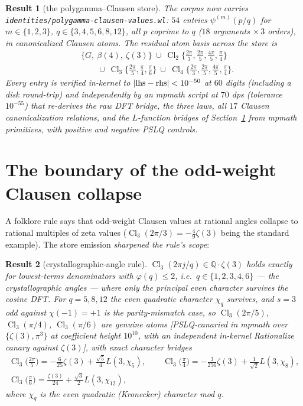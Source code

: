 \documentclass[11pt]{article}
\newtheorem{result}{Result}[section]
\theoremstyle{remark}
\newcommand{\Cl}{\operatorname{Cl}}
\newcommand{\Catalan}{G}
\newcommand{\dps}[1]{\textsf{\footnotesize[#1]}}
\begin{document}
\begin{result}[the polygamma--Clausen store]\label{res:store}
The corpus now carries \texttt{identities/polygamma-clausen-values.wl}: $54$ entries
$\psi^{(m)}(p/q)$ for $m\in\{1,2,3\}$, $q\in\{3,4,5,6,8,12\}$, all $p$ coprime to $q$
($18$ arguments $\times\,3$ orders), in canonicalized Clausen atoms. The residual atom
basis across the store is
\begin{align*}
&\{\Catalan,\ \beta(4),\ \zeta(3)\}\ \cup\
\Cl_2\bigl\{\tfrac{2\pi}{3},\tfrac{2\pi}{5},\tfrac{4\pi}{5},\tfrac{\pi}{4}\bigr\}\\
&\qquad\cup\
\Cl_3\bigl\{\tfrac{2\pi}{5},\tfrac{\pi}{4},\tfrac{\pi}{6}\bigr\}\ \cup\
\Cl_4\bigl\{\tfrac{2\pi}{3},\tfrac{2\pi}{5},\tfrac{4\pi}{5},\tfrac{\pi}{4}\bigr\}.
\end{align*}
Every entry is verified in-kernel to $|{\rm lhs}-{\rm rhs}|<10^{-50}$ at $60$ digits
(including a disk round-trip) and independently by an mpmath script at $70$ dps
(tolerance $10^{-55}$) that re-derives the raw DFT bridge, the three laws, all $17$
Clausen canonicalization relations, and the $L$-function bridges of
Section~\ref{sec:collapse} from mpmath primitives, with positive and negative PSLQ
controls.
\end{result}

\section{The boundary of the odd-weight Clausen collapse}\label{sec:collapse}

A folklore rule says that odd-weight Clausen values at rational angles collapse to
rational multiples of zeta values ($\Cl_3(2\pi/3)=-\tfrac49\zeta(3)$ being the standard
example). The store emission \emph{sharpened the rule's scope}:

\begin{result}[crystallographic-angle rule]\label{res:crystal}
$\Cl_3(2\pi j/q)\in\mathbb{Q}\cdot\zeta(3)$ holds exactly for lowest-terms denominators
with $\varphi(q)\le2$, i.e.\ $q\in\{1,2,3,4,6\}$ --- the crystallographic angles --- where
only the principal even character survives the cosine DFT. For $q=5,8,12$ the even
quadratic character $\chi_q$ survives, and $s=3$ odd against $\chi(-1)=+1$ is the
parity-\emph{mismatch} case, so $\Cl_3(2\pi/5)$, $\Cl_3(\pi/4)$, $\Cl_3(\pi/6)$ are genuine
atoms \dps{PSLQ-canaried in mpmath over $\{\zeta(3),\pi^3\}$ at coefficient height
$10^{10}$, with an independent in-kernel Rationalize canary against $\zeta(3)$}, with
exact character bridges
\begin{gather*}
\Cl_3\!\bigl(\tfrac{2\pi}{5}\bigr)=-\tfrac{6}{25}\zeta(3)+\tfrac{\sqrt5}{4}L(3,\chi_5),
\qquad
\Cl_3\!\bigl(\tfrac{\pi}{4}\bigr)=-\tfrac{3}{256}\zeta(3)+\tfrac{1}{\sqrt2}L(3,\chi_8),\\
\Cl_3\!\bigl(\tfrac{\pi}{6}\bigr)=\tfrac{\zeta(3)}{24}+\tfrac{\sqrt3}{2}L(3,\chi_{12}),
\end{gather*}
where $\chi_q$ is the even quadratic (Kronecker) character mod $q$.
\end{result}
\end{document}
